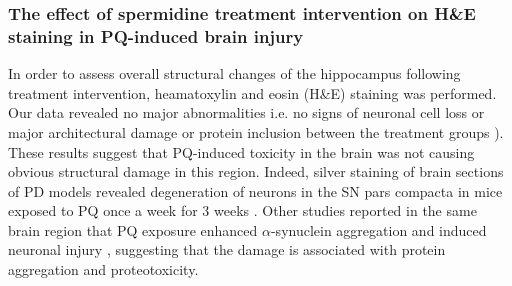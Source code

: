 \subsubsection{The effect of spermidine treatment intervention on H\&E staining in PQ-induced brain injury}
In order to assess overall structural changes of the hippocampus following treatment intervention, heamatoxylin and eosin (H\&E) staining was performed. Our data revealed no major abnormalities i.e. no signs of neuronal cell loss or major architectural damage or protein inclusion between the treatment groups ). These results suggest that PQ-induced toxicity in the brain was not causing obvious structural damage in this region. Indeed, silver staining of brain sections of PD models revealed degeneration of neurons in the SN pars compacta in mice exposed to PQ once a week for 3 weeks \citep{McCormack2002}. Other studies reported in the same brain region that PQ exposure enhanced $\alpha$-synuclein aggregation \citep{Manning-Bog2002} and induced neuronal injury \citep{Manning-Bog2003}, suggesting that the damage is associated with protein aggregation and proteotoxicity.


